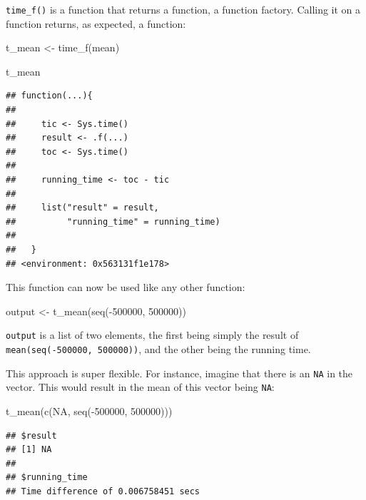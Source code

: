 \documentclass[
]{article}
\newenvironment{Shaded}{\begin{snugshade}}{\end{snugshade}}
\newcommand{\ConstantTok}[1]{\textcolor[rgb]{0.00,0.00,0.00}{#1}}
\newcommand{\DecValTok}[1]{\textcolor[rgb]{0.00,0.00,0.81}{#1}}
\newcommand{\FunctionTok}[1]{\textcolor[rgb]{0.00,0.00,0.00}{#1}}
\newcommand{\NormalTok}[1]{#1}
\newcommand{\OtherTok}[1]{\textcolor[rgb]{0.56,0.35,0.01}{#1}}
\newcommand{\SpecialCharTok}[1]{\textcolor[rgb]{0.00,0.00,0.00}{#1}}
\begin{document}
\texttt{time\_f()} is a function that returns a function, a function factory. Calling it on a function returns, as expected,
a function:

\begin{Shaded}
\begin{Highlighting}[]
\NormalTok{t\_mean }\OtherTok{\textless{}{-}} \FunctionTok{time\_f}\NormalTok{(mean)}

\NormalTok{t\_mean}
\end{Highlighting}
\end{Shaded}

\begin{verbatim}
## function(...){
## 
##     tic <- Sys.time()
##     result <- .f(...)
##     toc <- Sys.time()
## 
##     running_time <- toc - tic
## 
##     list("result" = result,
##          "running_time" = running_time)
## 
##   }
## <environment: 0x563131f1e178>
\end{verbatim}

This function can now be used like any other function:

\begin{Shaded}
\begin{Highlighting}[]
\NormalTok{output }\OtherTok{\textless{}{-}} \FunctionTok{t\_mean}\NormalTok{(}\FunctionTok{seq}\NormalTok{(}\SpecialCharTok{{-}}\DecValTok{500000}\NormalTok{, }\DecValTok{500000}\NormalTok{))}
\end{Highlighting}
\end{Shaded}

\texttt{output} is a list of two elements, the first being simply the result of \texttt{mean(seq(-500000,\ 500000))}, and the other
being the running time.

This approach is super flexible. For instance, imagine that there is an \texttt{NA} in the vector. This would result in
the mean of this vector being \texttt{NA}:

\begin{Shaded}
\begin{Highlighting}[]
\FunctionTok{t\_mean}\NormalTok{(}\FunctionTok{c}\NormalTok{(}\ConstantTok{NA}\NormalTok{, }\FunctionTok{seq}\NormalTok{(}\SpecialCharTok{{-}}\DecValTok{500000}\NormalTok{, }\DecValTok{500000}\NormalTok{)))}
\end{Highlighting}
\end{Shaded}

\begin{verbatim}
## $result
## [1] NA
## 
## $running_time
## Time difference of 0.006758451 secs
\end{verbatim}
\end{document}

